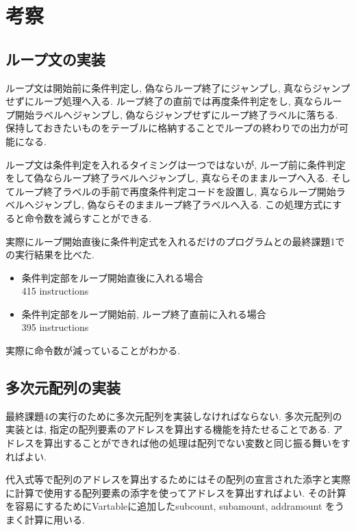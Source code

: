 \documentclass[a4j]{jarticle}
\begin{document}
\section{考察}

\subsection{ループ文の実装}

ループ文は開始前に条件判定し, 偽ならループ終了にジャンプし, 真ならジャンプせずにループ処理へ入る. ループ終了の直前では再度条件判定をし, 真ならループ開始ラベルへジャンプし, 偽ならジャンプせずにループ終了ラベルに落ちる. 保持しておきたいものをテーブルに格納することでループの終わりでの出力が可能になる. 

ループ文は条件判定を入れるタイミングは一つではないが, ループ前に条件判定をして偽ならループ終了ラベルへジャンプし, 真ならそのままループへ入る. そしてループ終了ラベルの手前で再度条件判定コードを設置し, 真ならループ開始ラベルへジャンプし, 偽ならそのままループ終了ラベルへ入る. 
この処理方式にすると命令数を減らすことができる. 

実際にループ開始直後に条件判定式を入れるだけのプログラムとの最終課題1での実行結果を比べた. 

\begin{itemize}
\item 条件判定部をループ開始直後に入れる場合\\
415 instructions
\item 条件判定部をループ開始前, ループ終了直前に入れる場合\\
395 instructions
\end{itemize}
実際に命令数が減っていることがわかる. 

\subsection{多次元配列の実装}
最終課題4の実行のために多次元配列を実装しなければならない. 
多次元配列の実装とは, 指定の配列要素のアドレスを算出する機能を持たせることである. 
アドレスを算出することができれば他の処理は配列でない変数と同じ振る舞いをすればよい. 

代入式等で配列のアドレスを算出するためにはその配列の宣言された添字と実際に計算で使用する配列要素の添字を使ってアドレスを算出すればよい. 
その計算を容易にするためにVartableに追加したsubcount, subamount, addramount をうまく計算に用いる. 
\end{document}
